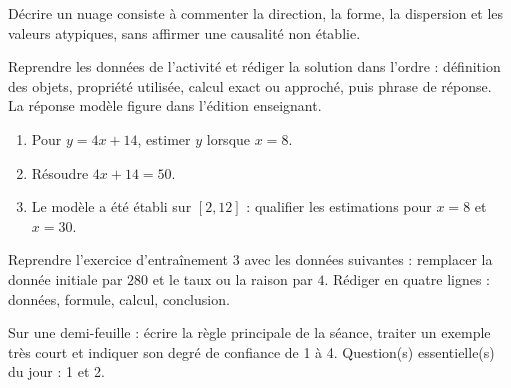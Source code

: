 \begin{traceecrite}Décrire un nuage consiste à commenter la direction, la forme, la dispersion et les valeurs atypiques, sans affirmer une causalité non établie.\end{traceecrite}

\begin{exemple}
Reprendre les données de l'activité et rédiger la solution dans l'ordre : définition des objets, propriété utilisée, calcul exact ou approché, puis phrase de réponse. La réponse modèle figure dans l'édition enseignant.
\end{exemple}

\begin{exercice}[-- essentiel]
\begin{enumerate}\item Pour $y=4x+14$, estimer $y$ lorsque $x=8$.\item Résoudre $4x+14=50$.\item Le modèle a été établi sur $[2,12]$ : qualifier les estimations pour $x=8$ et $x=30$.\end{enumerate}
\end{exercice}


\begin{dm}Reprendre l'exercice d'entraînement 3 avec les données suivantes : remplacer la donnée initiale par $280$ et le taux ou la raison par $4$. Rédiger en quatre lignes : données, formule, calcul, conclusion.\end{dm}

\begin{sortie}Sur une demi-feuille : écrire la règle principale de la séance, traiter un exemple très court et indiquer son degré de confiance de 1 à 4. Question(s) essentielle(s) du jour : 1 et 2.\end{sortie}

